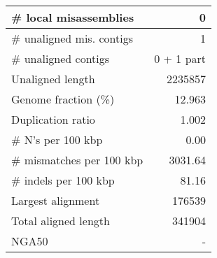 \documentclass[12pt,a4paper]{article}
\begin{document}
\begin{table}[ht]
\begin{center}
\begin{tabular}{|l*{1}{|r}|}
\# local misassemblies & 0 \\ \hline
\# unaligned mis. contigs & 1 \\ \hline
\# unaligned contigs & 0 + 1 part \\ \hline
Unaligned length & 2235857 \\ \hline
Genome fraction (\%) & 12.963 \\ \hline
Duplication ratio & 1.002 \\ \hline
\# N's per 100 kbp & 0.00 \\ \hline
\# mismatches per 100 kbp & 3031.64 \\ \hline
\# indels per 100 kbp & 81.16 \\ \hline
Largest alignment & 176539 \\ \hline
Total aligned length & 341904 \\ \hline
NGA50 & - \\ \hline
\end{tabular}
\end{center}
\end{table}
\end{document}

